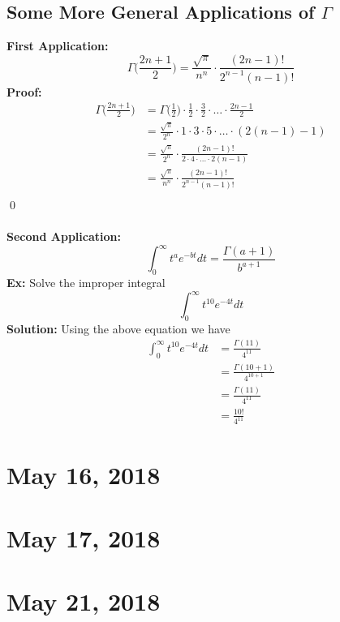 \documentclass{article}
\newcommand{\x}{\cdot}
\newcommand{\Ga}{\Gamma}
\begin{document}
\subsection{Some More General Applications of $\Ga$}
\textbf{First Application:}
\[\Ga\bigg(\frac{2n+1}{2}\bigg) = \frac{\sqrt{\pi}}{n^{n}}\x \frac{(2n-1)!}{2^{n-1}(n-1)!}\]
\textbf{Proof:}
\begin{align*}
\Ga\bigg(\frac{2n+1}{2}\bigg) &= \Ga\bigg(\frac{1}{2}\bigg)\x \frac{1}{2} \x \frac{3}{2}\x \dots \x \frac{2n-1}{2}\\
						&= \frac{\sqrt{\pi}}{2^{n}}\x 1\x 3\x 5\x \dots \x (2(n-1)-1)\\
						&= \frac{\sqrt{\pi}}{2^{n}}\x \frac{(2n-1)!}{2\x 4\x \dots\x 2(n-1)}\\
						&= \frac{\sqrt{\pi}}{n^{n}}\x \frac{(2n-1)!}{2^{n-1}(n-1)!}\\
\end{align*}
\qed\\\\
\textbf{Second Application:}
\[\int_{0}^{\infty} t^{a}e^{-bt} dt = \frac{\Ga(a+1)}{b^{a+1}}\]
\textbf{Ex:} Solve the improper integral
\[\int_{0}^{\infty} t^{10}e^{-4t} dt\]
\textbf{Solution:} Using the above equation we have
\begin{align*}
\int_{0}^{\infty} t^{10}e^{-4t} dt & =  \frac{\Ga(11)}{4^{11}}\\
							& =  \frac{\Ga(10+1)}{4^{10+1}}\\
							& =  \frac{\Ga(11)}{4^{11}}\\
							& =  \frac{10!}{4^{11}}
\end{align*}
\newpage


\section{May 16, 2018}
\newpage


\section{May 17, 2018}
\newpage


\section{May 21, 2018}
\newpage
\end{document}
